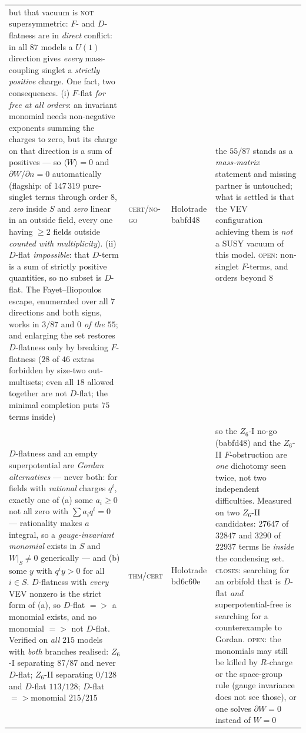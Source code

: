 \documentclass[12pt,a4paper]{article}
\def\mathbb#1{#1}%
\def\textbf#1{#1}%
\def\texttt#1{#1}%
\def\cdot{ }%
\def\Rightarrow{ => }%
\theoremstyle{definition}
\newcommand{\ZZ}{\mathbb{Z}}
\begin{document}
\begin{center}
\begin{tabular}{@{}p{}llp{}@{}}
\textbf{but that vacuum is \textsc{not} supersymmetric: $F$- and $D$-flatness are in \emph{direct} conflict}: in all $87$ models a $U(1)$ direction gives \emph{every} mass-coupling singlet a \emph{strictly positive} charge. One fact, two consequences. (i) $F$-flat \emph{for free at all orders}: an invariant monomial needs non-negative exponents summing the charges to zero, but its charge on that direction is a sum of positives --- so $\langle W\rangle=0$ and $\partial W/\partial n=0$ automatically (flagship: of $147\,319$ pure-singlet terms through order $8$, \emph{zero} inside $S$ and \emph{zero} linear in an outside field, every one having $\ge 2$ fields outside \emph{counted with multiplicity}). (ii) $D$-flat \emph{impossible}: that $D$-term is a sum of strictly positive quantities, so no subset is $D$-flat. The Fayet--Iliopoulos escape, enumerated over all $7$ directions and both signs, works in $3/87$ and \emph{$0$ of the $55$}; and enlarging the set restores $D$-flatness only by breaking $F$-flatness ($28$ of $46$ extras forbidden by size-two out-multisets; even all $18$ allowed together are not $D$-flat; the minimal completion puts $75$ terms inside) & \textsc{cert}/\textsc{no-go} & Holotrade \texttt{babfd48} & the $55/87$ stands as a \emph{mass-matrix} statement and missing partner is untouched; what is settled is that the VEV configuration achieving them is \emph{not} a SUSY vacuum of this model. \textsc{open}: non-singlet $F$-terms, and orders beyond $8$ \\
\textbf{$D$-flatness and an empty superpotential are \emph{Gordan alternatives} --- never both}: for fields with \emph{rational} charges $q^i$, exactly one of (a) some $a_i\ge0$ not all zero with $\sum a_iq^i=0$ --- rationality makes $a$ integral, so a \emph{gauge-invariant monomial} exists in $S$ and $W|_S\neq0$ generically --- and (b) some $y$ with $q^i\!\cdot\!y>0$ for all $i\in S$. $D$-flatness with \emph{every} VEV nonzero is the strict form of (a), so $D$-flat $\Rightarrow$ a monomial exists, and no monomial $\Rightarrow$ not $D$-flat. Verified on \emph{all} $215$ models with \emph{both} branches realised: $\ZZ_6$-I separating $87/87$ and never $D$-flat; $\ZZ_6$-II separating $0/128$ and $D$-flat $113/128$; $D$-flat$\Rightarrow$monomial $215/215$ & \textsc{thm}/\textsc{cert} & Holotrade \texttt{bd6c60e} & so the $\ZZ_6$-I no-go (\texttt{babfd48}) and the $\ZZ_6$-II $F$-obstruction are \emph{one} dichotomy seen twice, not two independent difficulties. Measured on two $\ZZ_6$-II candidates: $27647$ of $32847$ and $3290$ of $22937$ terms lie \emph{inside} the condensing set. \textsc{closes}: searching for an orbifold that is $D$-flat \emph{and} superpotential-free is searching for a counterexample to Gordan. \textsc{open}: the monomials may still be killed by $R$-charge or the space-group rule (gauge invariance does not see those), or one solves $\partial W=0$ instead of $W=0$ \\

\end{tabular}
\end{center}
\end{document}
